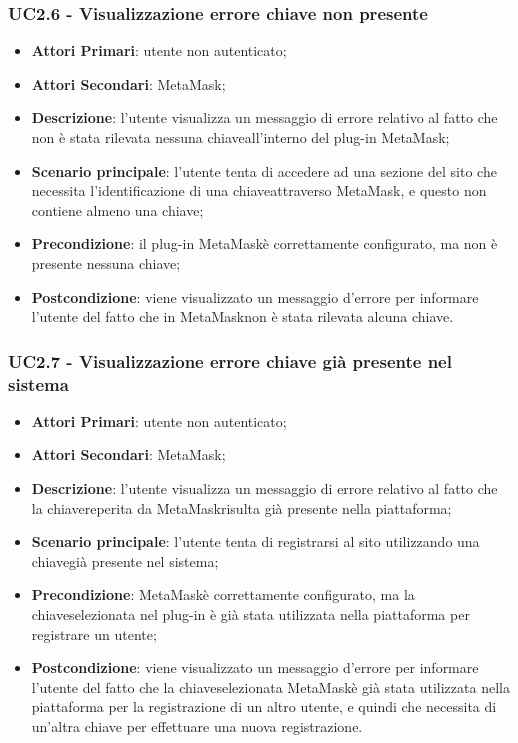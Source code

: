 \subsubsection{UC2.6 - Visualizzazione errore chiave non 
	presente}
\begin{itemize}
	\item \textbf{Attori Primari}: utente non autenticato;
	\item \textbf{Attori Secondari}: MetaMask\glo;
	\item \textbf{Descrizione}:
	l'utente visualizza un messaggio di errore relativo al fatto che non è stata rilevata nessuna chiave\glosp all'interno del plug-in MetaMask\glo;
	\item \textbf{Scenario principale}: l'utente tenta di accedere ad una sezione del sito che necessita l'identificazione di una chiave\glosp attraverso MetaMask\glo, e questo non contiene almeno una chiave\glo;
	\item \textbf{Precondizione}: il plug-in MetaMask\glosp è correttamente configurato, ma non è presente nessuna chiave\glo;
	\item \textbf{Postcondizione}: viene visualizzato un messaggio d'errore per informare l'utente del fatto che in MetaMask\glosp non è stata rilevata alcuna chiave\glo.
	
\end{itemize}




\subsubsection{UC2.7 - Visualizzazione errore chiave già presente nel sistema}
\begin{itemize}
	\item \textbf{Attori Primari}: utente non autenticato;
	\item \textbf{Attori Secondari}: MetaMask\glo;
	\item \textbf{Descrizione}:
	l'utente visualizza un messaggio di errore relativo al fatto che la chiave\glosp reperita da MetaMask\glosp risulta già presente nella piattaforma;
	\item \textbf{Scenario principale}: l'utente tenta di registrarsi al sito utilizzando una chiave\glosp già presente nel sistema;
	\item \textbf{Precondizione}: MetaMask\glosp è correttamente configurato, ma la chiave\glosp selezionata nel plug-in è già stata utilizzata nella piattaforma per registrare un utente;
	\item \textbf{Postcondizione}: viene visualizzato un messaggio d'errore per informare l'utente del fatto che la chiave\glosp selezionata MetaMask\glosp è già stata utilizzata nella piattaforma per la registrazione di un altro utente, e quindi che necessita di un'altra chiave per effettuare una nuova registrazione.
\end{itemize}

